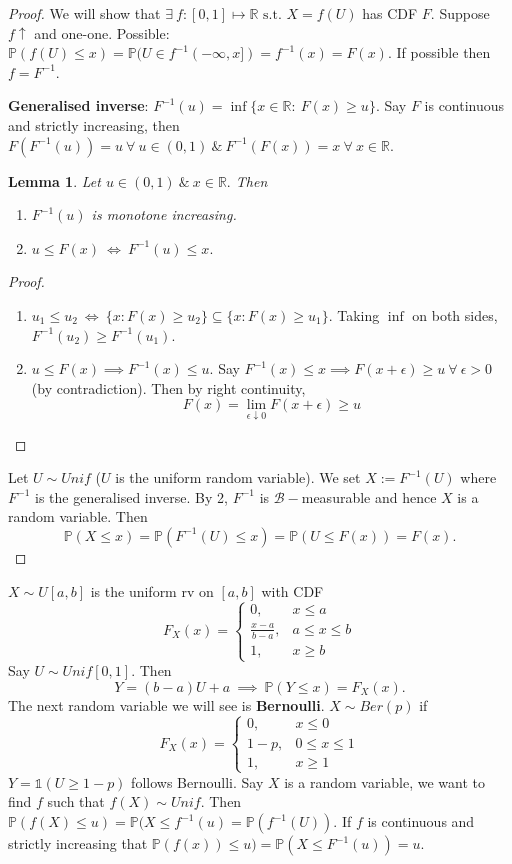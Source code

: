 \documentclass{article}
\newcommand{\1}{\mathds{1}}
\newcommand{\R}{\mathbb{R}}
\newcommand{\B}{\mathcal{B}}
\newcommand{\PB}{\mathbb{P}}
\newcommand{\f}[2]{\frac{#1}{#2}}
\newcommand{\st}{\text{ s.t. }}
\newtheorem{lemma}[theorem]{Lemma}
\begin{document}
\begin{proof}
    We will show that $\exists\ f:[0,1]\mapsto\R\st X=f(U)$ has CDF $F.$ Suppose $f\uparrow$ and one-one. Possible: $\PB(f(U)\leq x)=\PB(U\in f^{-1}(-\infty,x])=f^{-1}(x)=F(x).$ If possible then $f=F^{-1}.$
    
    \noindent\textbf{Generalised inverse}: $F^{-1}(u)=\inf\{x\in\R:\ F(x)\geq u\}.$ Say $F$ is continuous and strictly increasing, then $F(F^{-1}(u))=u\ \forall\ u\in (0,1)\ \&\ F^{-1}(F(x))=x\ \forall\ x\in\R.$ 

\begin{lemma}
    Let $u\in (0,1)\ \&\ x\in\R.$ Then 
    \begin{enumerate}
        \item $F^{-1}(u)$ is monotone increasing.
        \item $u\leq F(x)\ \iff\ F^{-1}(u)\leq x.$
    \end{enumerate}
\end{lemma}
\begin{proof}
    \begin{enumerate}
        \item $u_1\leq u_2\ \iff\ \{x:F(x)\geq u_2\}\subseteq \{x:F(x)\geq u_1\}.$ Taking $\inf$ on both sides, $F^{-1}(u_2)\geq F^{-1}(u_1).$
        \item $u\leq F(x)\implies F^{-1}(x)\leq u.$ Say $F^{-1}(x)\leq x\implies F(x+\epsilon)\geq u\ \forall\ \epsilon>0$ (by contradiction). Then by right continuity, $$F(x)=\lim_{\epsilon\downarrow0}F(x+\epsilon)\geq u$$
    \end{enumerate}
\end{proof}
Let $U\sim Unif$ ($U$ is the uniform random variable). We set $X:=F^{-1}(U)$ where $F^{-1}$ is the generalised inverse. By 2, $F^{-1}$ is $\B-$measurable and hence $X$ is a random variable. Then $$\PB(X\leq x)=\PB(F^{-1}(U)\leq x)=\PB(U\leq F(x))=F(x).$$
\end{proof}
$X\sim U[a,b]$ is the uniform rv on $[a,b]$ with CDF $$F_X(x)=\begin{cases}
    0,& x\leq a\\\f{x-a}{b-a},& a\leq x\leq b\\1,&x\geq b
\end{cases}$$
Say $U\sim Unif[0,1].$ Then $$Y=(b-a)U+a\ \implies\ \PB(Y\leq x)=F_X(x).$$
The next random variable we will see is \textbf{Bernoulli}. $X\sim Ber(p)$ if $$F_X(x)=\begin{cases}
    0,&x\leq 0\\1-p,&0\leq x\leq 1\\1,&x\geq 1
\end{cases}$$
$Y=\1(U\geq 1-p)$ follows Bernoulli. Say $X$ is a random variable, we want to find $f$ such that $f(X)\sim Unif.$ Then $\PB(f(X)\leq u)=\PB(X\leq f^{-1}(u)=\PB(f^{-1}(U)).$ If $f$ is continuous and strictly increasing that $\PB(f(x))\leq u)=\PB(X\leq F^{-1}(u))=u.$
\end{document}
